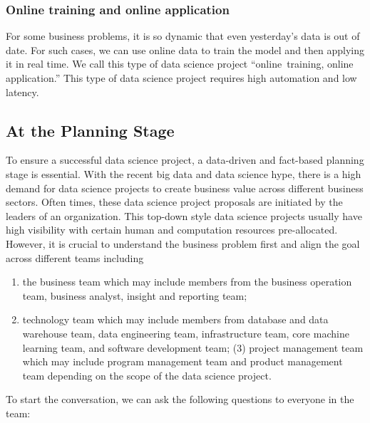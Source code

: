 \documentclass[12pt,]{krantz}
\begin{document}
\hypertarget{online-training-and-online-application}{%
\subsubsection{Online training and online application}\label{online-training-and-online-application}}

For some business problems, it is so dynamic that even yesterday's data is out of date. For such cases, we can use online data to train the model and then applying it in real time. We call this type of data science project ``online~training, online application.'' This type of data science project requires high automation and low latency.

\hypertarget{at-the-planning-stage}{%
\subsection{At the Planning Stage}\label{at-the-planning-stage}}

To ensure a successful data science project, a data-driven and fact-based planning stage is essential. With the recent big data and data science hype, there is a high demand for data science projects to create business value across different business sectors. Often times, these data science project proposals are initiated by the leaders of an organization. This top-down style data science projects usually have high visibility with certain human and computation resources pre-allocated. However, it is crucial to understand the business problem first and align the goal across different teams including

\begin{enumerate}
\def\labelenumi{(\arabic{enumi})}
\item
  the business team which may include members from the business operation team, business analyst, insight and reporting team;
\item
  technology team which may include members from database and data warehouse team, data engineering team, infrastructure team, core machine learning team, and software development team; (3) project management team which may include program management team and product management team depending on the scope of the data science project.
\end{enumerate}

To start the conversation, we can ask the following questions to everyone in the team:
\end{document}
